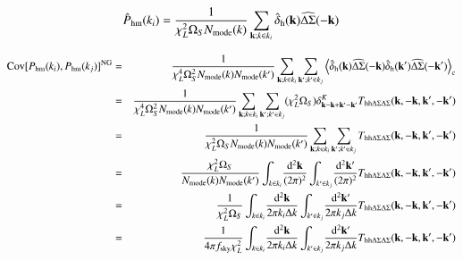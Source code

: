\documentclass[onecolumn,notitlepage,showpacs,amsmath,amssymb,prd,floatfix]{revtex4-1}
\def\ave#1{\left\langle #1 \right\rangle}
\newcommand{\bk}{{\bf k}}
\newcommand{\dr}{\mathrm{d}}
\newcommand{\phm}{P_{\mathrm{hm}}}
\newcommand{\bh}{\mathrm{h}}
\newcommand{\dsigma}{\Delta\Sigma}
\newcommand{\hdsigma}{\widehat{\dsigma}}
\begin{document}
\begin{equation}
\hat{P}_{\rm hm}(k_i)=\frac{1}{\chi_L^2\Omega_S N_{\rm mode}(k)}\sum_{\bk;
 k\in k_i} \hat{\delta}_\bh(\bk)\hdsigma(-\bk)
\end{equation}

\begin{eqnarray}
{\rm Cov}[\phm(k_i),\phm(k_j)]^{\rm NG}&=&\frac{1}{\chi_L^4\Omega_S^2N_{\rm
 mode}(k)N_{\rm mode}(k')}\sum_{\bk; k\in k_i}
 \sum_{\bk'; k'\in k_j}
 \ave{\hat{\delta}_\bh(\bk)\hdsigma(-\bk)\hat{\delta}_\bh(\bk')\hdsigma(-\bk')}_{\rm
 c}\nonumber\\
&=&\frac{1}{\chi_L^4\Omega_S^2N_{\rm
 mode}(k)N_{\rm mode}(k')}\sum_{\bk; k\in k_i}
 \sum_{\bk'; k'\in k_j}(\chi_L^2\Omega_S)\delta^K_{\bk-\bk+\bk'-\bk'}
 T_{{\rm hh}\dsigma\dsigma}(\bk,-\bk,\bk',-\bk')\nonumber\\
 &=&\frac{1}{\chi_L^2\Omega_SN_{\rm
 mode}(k)N_{\rm mode}(k')}\sum_{\bk; k\in k_i}
 \sum_{\bk'; k'\in k_j}
 T_{{\rm hh}\dsigma\dsigma}(\bk,-\bk,\bk',-\bk')\nonumber\\
&=& \frac{\chi_L^2\Omega_S}{N_{\rm
 mode}(k)N_{\rm mode}(k')}
\int_{k\in k_i}\!\frac{\dr^2\bk}{(2\pi)^2}
\int_{k'\in k_j}\!\frac{\dr^2\bk'}{(2\pi)^2}
 T_{{\rm hh}\dsigma\dsigma}(\bk,-\bk,\bk',-\bk')\nonumber\\
&=& \frac{1}{\chi_L^2\Omega_S}
\int_{k\in k_i}\!\frac{\dr^2\bk}{2\pi k_i\Delta k}
\int_{k'\in k_j}\!\frac{\dr^2\bk'}{2\pi k_j\Delta k}
 T_{{\rm hh}\dsigma\dsigma}(\bk,-\bk,\bk',-\bk')\nonumber\\
&=& \frac{1}{4\pi f_{\rm sky}\chi_L^2}
\int_{k\in k_i}\!\frac{\dr^2\bk}{2\pi k_i\Delta k}
\int_{k'\in k_j}\!\frac{\dr^2\bk'}{2\pi k_j\Delta k}
 T_{{\rm hh}\dsigma\dsigma}(\bk,-\bk,\bk',-\bk')
\end{eqnarray}
\end{document}
